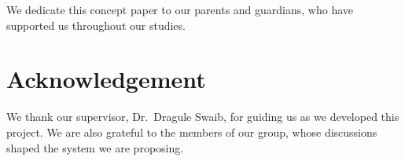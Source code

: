 \documentclass[12pt,a4paper]{article}
\newcommand{\supervisor}{Dr.\ Dragule Swaib}
\newcommand{\doctypelower}{concept paper}
\begin{document}
We dedicate this \doctypelower{} to our parents and guardians, who have supported us throughout our studies.

\clearpage
\section*{Acknowledgement}

We thank our supervisor, \supervisor, for guiding us as we developed this project. We are also grateful to the members of our group, whose discussions shaped the system we are proposing.

\clearpage
\tableofcontents

\clearpage
{}





\renewcommand{\refname}{References}


\end{document}
